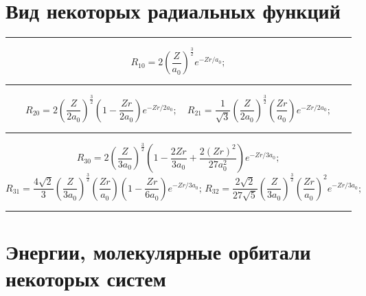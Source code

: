 \section{Вид некоторых радиальных функций}
\rule{\textwidth}{0.4pt}
\[ R_{10}=2 \left( \dfrac{Z}{a_0} \right)^{\frac{3}{2}}e^{-Zr/a_0}; \]
\rule{\textwidth}{0.4pt}
\[ R_{20}=2 \left( \dfrac{Z}{2a_0} \right)^{\frac{3}{2}}\left( 1-\dfrac{Zr}{2a_0} \right)e^{-Zr/2a_0}; \quad R_{21}=\dfrac{1}{\sqrt{3}} \left( \dfrac{Z}{2a_0} \right)^{\frac{3}{2}}\left( \dfrac{Zr}{a_0} \right)e^{-Zr/2a_0};\]
\rule{\textwidth}{0.4pt}
\[ R_{30}=2 \left( \dfrac{Z}{3a_0} \right)^{\frac{3}{2}}\left( 1-\dfrac{2Zr}{3a_0}+\dfrac{2(Zr)^2}{27a_0^2} \right)e^{-Zr/3a_0};\] 
\[ R_{31}=\dfrac{4\sqrt{2}}{3} \left( \dfrac{Z}{3a_0} \right)^{\frac{3}{2}}\left( \dfrac{Zr}{a_0} \right)\left(1- \dfrac{Zr}{6a_0} \right)e^{-Zr/3a_0};\,R_{32}=\dfrac{2\sqrt2}{27\sqrt{5}} \left( \dfrac{Z}{3a_0} \right)^{\frac{3}{2}}\left( \dfrac{Zr}{a_0} \right)^2e^{-Zr/3a_0};\]
\rule{\textwidth}{0.4pt}


\section{\texorpdfstring{Энергии, молекулярные орбитали некоторых систем}{Энергии, молекулярные орбитали некоторых систем}}

\vspace{3mm}

